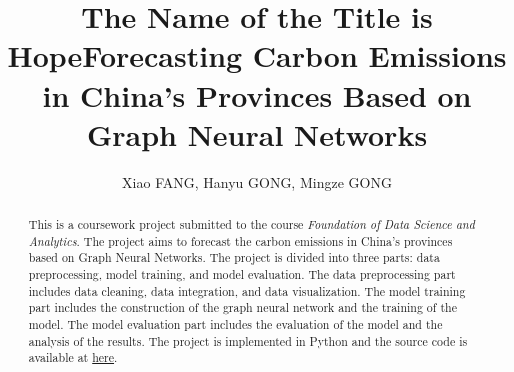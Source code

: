\documentclass[sigconf, authordraft]{acmart}
\begin{document}
	\title{The Name of the Title is Hope}
	\title{Forecasting Carbon Emissions in China's Provinces Based on Graph Neural Networks}



	\author{Xiao FANG, Hanyu GONG, Mingze GONG}


	\renewcommand{\shortauthors}{Xiao, Hanyu \& Mingze}


	\begin{abstract}
		This is a coursework project submitted to the course \textit{Foundation of Data
		Science and Analytics}. The project aims to forecast the carbon emissions in
		China's provinces based on Graph Neural Networks. The project is divided
		into three parts: data preprocessing, model training, and model evaluation.
		The data preprocessing part includes data cleaning, data integration, and
		data visualization. The model training part includes the construction of the
		graph neural network and the training of the model. The model evaluation
		part includes the evaluation of the model and the analysis of the results. The
		project is implemented in Python and the source code is available at \href{https://github.com/palaceparis/DSAA5020_Group_Project}{here}.
	\end{abstract}


\end{document}
